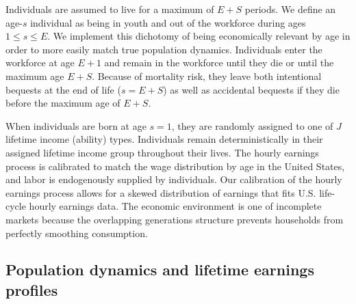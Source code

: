 \documentclass[letterpaper,12pt]{article}
\theoremstyle{definition}
\begin{document}
\begin{spacing}{1.5}
  Individuals are assumed to live for a maximum of $E+S$ periods. We define an age-$s$ individual as being in youth and out of the workforce during ages $1\leq s\leq E$. We implement this dichotomy of being economically relevant by age in order to more easily match true population dynamics. Individuals enter the workforce at age $E+1$ and remain in the workforce until they die or until the maximum age $E+S$. Because of mortality risk, they leave both intentional bequests at the end of life ($s=E+S$) as well as accidental bequests if they die before the maximum age of $E+S$.

  When individuals are born at age $s=1$, they are randomly assigned to one of $J$ lifetime income (ability) types. Individuals remain deterministically in their assigned lifetime income group throughout their lives. The hourly earnings process is calibrated to match the wage distribution by age in the United States, and labor is endogenously supplied by individuals. Our calibration of the hourly earnings process allows for a skewed distribution of earnings that fits U.S. life-cycle hourly earnings data. The economic environment is one of incomplete markets because the overlapping generations structure prevents households from perfectly smoothing consumption.



  \subsection{Population dynamics and lifetime earnings profiles}\label{SecPopDyn}


\end{spacing}
\end{document}
